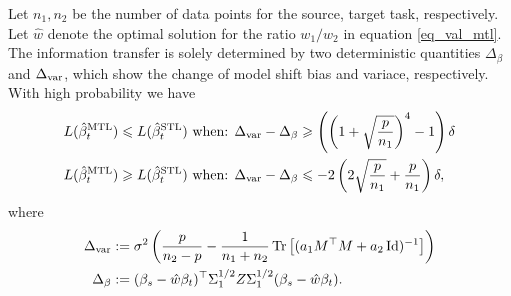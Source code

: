 \begin{theorem}\label{thm_model_shift}
	Let $n_1, n_2$ be the number of data points for the source, target task, respectively.
	Let $\hat{w}$ denote the optimal solution for the ratio $w_1/w_2$ in equation \eqref{eq_val_mtl}.
	The information transfer is solely determined by two deterministic quantities $\Delta_{\beta}$ and $\Delta_{\text{var}}$, which show the change of model shift bias and variace, respectively.
	With high probability we have
	\begin{align}
	 	L(\hat{\beta}_{t}^{\text{MTL}}) \leqslant L(\hat{\beta}_t^{\text{STL}}) \text{ when: } &\Delta_{\text{var}} - \Delta_{\beta} \geqslant \left(\left({1 + \sqrt{\frac{p} {n_1}}}\right)^4 - 1 \right) \delta \label{upper}\\
		L(\hat{\beta}_t^{\text{MTL}}) \geqslant L(\hat{\beta}_t^{\text{STL}}) \text{ when: } &\Delta_{\text{var}} - \Delta_{\beta} \leqslant -2\left({2\sqrt{\frac {p}{n_1}} + \frac{p}{n_1}}\right) \delta, \label{lower}
	\end{align}
	where
	\begin{align*} %
		\Delta_{\vari} &\define {\sigma^2}\bigbrace{\frac{p}{n_2 - p} -  \frac{1}{n_1 + n_2} \bigtr{(a_1 M^{\top}M + a_2\id)^{-1}} } \\
		\Delta_{\beta} &\define (\beta_s - \hat{w}\beta_t)^{\top} \Sigma_1^{1/2} Z \Sigma_1^{1/2} (\beta_s - \hat{w}\beta_t).
	\end{align*}
\end{theorem}





